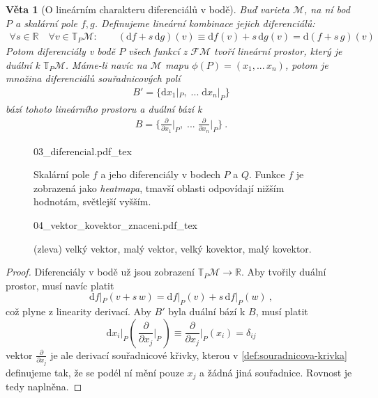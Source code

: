\documentclass{article}
\newcommand{\incfig}[1]{%
    \def\svgwidth{\columnwidth}
    {#1.pdf_tex}
}
\newtheorem{theorem}{Věta}[section]
\theoremstyle{definition}
\def\ph{\phantom}
\newcommand{\const}[1]{\mathrm{#1}}
\renewcommand{\d}[1]{\const{d} #1}
\newcommand{\pd}[2]{\frac{\partial  #1}{\partial  #2}}
\newcommand{\R}{\mathbb{R}}
\def\Manif{\mathcal{M}}
\def\Func{\mathcal{F}}
\def\Tang{\mathbb{T}}
\begin{document}
\begin{theorem}[O lineárním charakteru diferenciálů v bodě]
Buď varieta $\Manif$, na ní bod $P$ a skalární pole $f, g$. Definujeme lineární kombinace jejich diferenciálů:
\begin{align*}
    \forall s \in \R \quad
    \forall v \in \Tang_P\Manif :
    \qquad
    \left( \d{f} + s \, \d{g} \right)(v)
    \equiv
    \d{f}(v) + s \, \d{g}(v)
    =
    \d{(f + s\,g)}(v)
\end{align*}
Potom diferenciály v bodě $P$ všech funkcí z $\Func\Manif$ tvoří lineární prostor, který je duální k $\Tang_P\Manif$. Máme-li navíc na $\Manif$ mapu $\phi(P) = (x_1, ... \, x_n)$, potom je množina diferenciálů souřadnicových polí
\begin{align*}
    B' = \big\{
        \d{x_1}|_P,
        \; ... \;
        \d{x_n}|_P
    \big\}
\end{align*}
bází tohoto lineárního prostoru a duální bází k
\begin{align*}
    B =
    \Big\{
        \pd{}{x_1}\Big|_P,
        \; ... \;
        \pd{}{x_n}\Big|_P
    \Big\}
    \: .
\end{align*}
\end{theorem}
\ph{.} \vspace{-\baselineskip}
\begin{wrapfigure}{r}{8cm}
    \vspace{-\baselineskip}
    \centering
    \def\columnwidth{8cm}
    \incfig{03_diferencial}
    \vspace{-2.2\baselineskip}
    \caption{Skalární pole $f$ a jeho diferenciály v bodech $P$ a $Q$. Funkce $f$ je zobrazená jako \textit{heatmapa}, tmavší oblasti odpovídají nižším hodnotám, světlejší vyšším.}
    \label{obr:kovektor}
    
    \vspace{2\baselineskip}
    \incfig{04_vektor_kovektor_znaceni}
    \vspace{-2.2\baselineskip}
    \caption{(zleva) velký vektor, malý vektor, velký kovektor, malý kovektor.}
    \label{obr:vektor-kovektor-znaceni}
    \vspace{-2\baselineskip}
\end{wrapfigure}
\begin{proof}
Diferenciály v bodě už jsou zobrazení $\Tang_P\Manif \to \R$. Aby tvořily duální prostor, musí navíc platit
\begin{equation*}
    \d{f}|_P(v + s\,w) = \d{f}|_P(v) + s \, \d{f}|_P(w) \: ,
\end{equation*}
což plyne z linearity derivací. Aby $B'$ byla duální bází k $B$, musí platit
\begin{equation*}
    \d{x_i}|_P(\, \pd{}{x_j}\Big|_P \,)
    \equiv \pd{}{x_j}\Big|_P( x_i )
    = \delta_{ij}
\end{equation*}
vektor $\pd{}{x_j}$ je ale derivací souřadnicové křivky, kterou v \ref{def:souradnicova-krivka} definujeme tak, že se podél ní mění pouze $x_j$ a žádná jiná souřadnice. Rovnost je tedy naplněna.
\end{proof}
\end{document}
